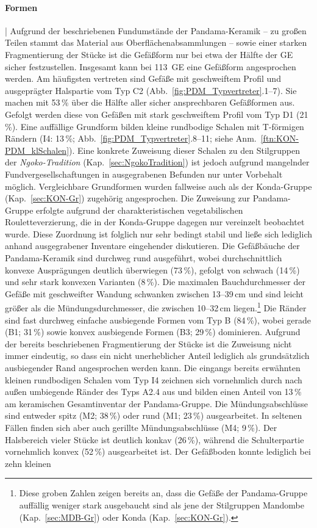 \paragraph{Formen}\hspace{-.5em}|\hspace{.5em}%
Aufgrund der beschriebenen Fundumstände der Pandama-Keramik -- zu großen Teilen stammt das Material aus Oberflächenabsammlungen -- sowie einer starken Fragmentierung der Stücke ist die Gefäßform nur bei etwa der Hälfte der GE sicher festzustellen. Insgesamt kann bei 113~GE eine Gefäßform angesprochen werden. Am häufigsten vertreten sind Gefäße mit geschweiftem Profil und ausgeprägter Halspartie vom Typ C2 (Abb.~\ref{fig:PDM_Typvertreter}.1--7). Sie machen mit 53\,\% über die Hälfte aller sicher ansprechbaren Gefäßformen aus. Gefolgt werden diese von Gefäßen mit stark geschweiftem Profil vom Typ D1 (21\,\%). Eine auffällige Grundform bilden kleine rundbodige Schalen mit T-förmigen Rändern (I4: 13\,\%; Abb.~\ref{fig:PDM_Typvertreter}.8--11; siehe Anm.~\ref{ftn:KON-PDM_klSchalen}). Eine konkrete Zuweisung dieser Schalen zu den Stilgruppen der \textit{\mbox{Ngoko}-Tradition} (Kap.~\ref{sec:NgokoTradition}) ist jedoch aufgrund mangelnder Fundvergesellschaftungen in ausgegrabenen Befunden nur unter Vorbehalt möglich. Vergleichbare Grundformen wurden fallweise auch als der Konda-Gruppe (Kap.~\ref{sec:KON-Gr}) zugehörig angesprochen. Die Zuweisung zur Pandama-Gruppe erfolgte aufgrund der charakteristischen vegetabilischen Rouletteverzierung, die in der Konda-Gruppe dagegen nur vereinzelt beobachtet wurde. Diese Zuordnung ist folglich nur sehr bedingt stabil und ließe sich lediglich anhand ausgegrabener Inventare eingehender diskutieren. Die Gefäßbäuche der Pandama-Keramik sind durchweg rund ausgeführt, wobei durchschnittlich konvexe Ausprägungen deutlich überwiegen (73\,\%), gefolgt von schwach (14\,\%) und sehr stark konvexen Varianten (8\,\%). Die maximalen Bauchdurchmesser der Gefäße mit geschweifter Wandung schwanken zwischen 13--39\,cm und sind leicht größer als die Mündungsdurchmesser, die zwischen 10--32\,cm liegen.\footnote{Diese groben Zahlen zeigen bereits an, dass die Gefäße der Pandama-Gruppe auffällig weniger stark ausgebaucht sind als jene der Stilgruppen Mandombe (Kap.~\ref{sec:MDB-Gr}) oder Konda (Kap.~\ref{sec:KON-Gr}).} Die Ränder sind fast durchweg einfache ausbiegende Formen vom Typ B (84\,\%), wobei gerade (B1; 31\,\%) sowie konvex ausbiegende Formen (B3; 29\,\%) dominieren. Aufgrund der bereits beschriebenen Fragmentierung der Stücke ist die Zuweisung nicht immer eindeutig, so dass ein nicht unerheblicher Anteil lediglich als grundsätzlich ausbiegender Rand angesprochen werden kann. Die eingangs bereits erwähnten kleinen rundbodigen Schalen vom Typ I4 zeichnen sich vornehmlich durch nach außen umbiegende Ränder des Typs A2.4 aus und bilden einen Anteil von 13\,\% am keramischen Gesamtinventar der Pandama-Gruppe. Die Mündungsabschlüsse sind entweder spitz (M2; 38\,\%) oder rund (M1; 23\,\%) ausgearbeitet. In seltenen Fällen finden sich aber auch gerillte Mündungsabschlüsse (M4; 9\,\%). Der Halsbereich vieler Stücke ist deutlich konkav (26\,\%), während die Schulterpartie vornehmlich konvex (52\,\%) ausgearbeitet ist. Der Gefäßboden konnte lediglich bei zehn kleinen 